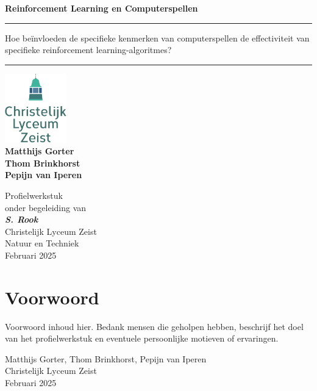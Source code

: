 \documentclass[a4paper,12pt]{report}
\begin{document}
\begin{titlepage}
  \centering
  \vspace*{0cm}

  \Huge\textbf{Reinforcement Learning en Computerspellen} \\
  \vspace{1cm}
  \rule{\linewidth}{0.4mm}
  \Large
  Hoe beïnvloeden de specifieke kenmerken van computerspellen de effectiviteit van specifieke reinforcement learning-algoritmes?
  \rule{\linewidth}{0.4mm}

  \vspace{1.5cm}
  \includegraphics[width=0.2\textwidth]{logo-clz.png} \\
  \vspace{1.5cm}
  \large
  \textbf{Matthijs Gorter} \\
  \textbf{Thom Brinkhorst} \\
  \textbf{Pepijn van Iperen} \\
  \vspace{\fill}
  \normalsize

  Profielwerkstuk \\ onder begeleiding van \\ \textit{\textbf{S. Rook}} \\
  Christelijk Lyceum Zeist \\ Natuur en Techniek \\ Februari 2025 \\ \newpage
\end{titlepage}

\chapter*{Voorwoord}
Voorwoord inhoud hier. Bedank mensen die geholpen hebben, beschrijf het doel van het profielwerkstuk en eventuele persoonlijke motieven of ervaringen.

\vspace{1cm}
\noindent
Matthijs Gorter, Thom Brinkhorst, Pepijn van Iperen \\
Christelijk Lyceum Zeist \\
Februari 2025
\end{document}
